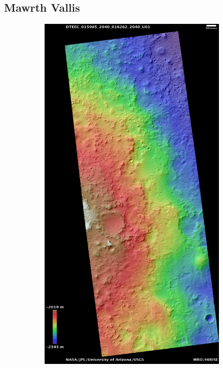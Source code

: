 \documentclass[12pt]{article}
\begin{document}
\subsection{Mawrth Vallis}
\label{sub:mawrth_vallis}
\begin{figure}[h!]
  \centering
  \begin{subfigure}[t]{0.43\textwidth}
    \centering
    \includegraphics[height=0.5\paperheight]{figures/maps/ESP_015985_2040/DTEEC_015985_2040_016262_2040_U01.jpg}

\end{subfigure}
\end{figure}
\end{document}
